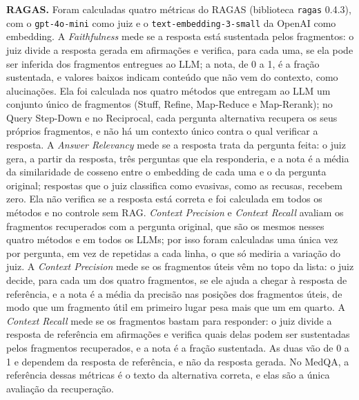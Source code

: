 \textbf{RAGAS.} Foram calculadas quatro métricas do RAGAS \cite{es2024ragas} (biblioteca \texttt{ragas} 0.4.3), com o \texttt{gpt-4o-mini} como juiz e o \texttt{text-embedding-3-small} da OpenAI como embedding. A \emph{Faithfulness} mede se a resposta está sustentada pelos fragmentos: o juiz divide a resposta gerada em afirmações e verifica, para cada uma, se ela pode ser inferida dos fragmentos entregues ao LLM; a nota, de 0 a 1, é a fração sustentada, e valores baixos indicam conteúdo que não vem do contexto, como alucinações. Ela foi calculada nos quatro métodos que entregam ao LLM um conjunto único de fragmentos (Stuff, Refine, Map-Reduce e Map-Rerank); no Query Step-Down e no Reciprocal, cada pergunta alternativa recupera os seus próprios fragmentos, e não há um contexto único contra o qual verificar a resposta. A \emph{Answer Relevancy} mede se a resposta trata da pergunta feita: o juiz gera, a partir da resposta, três perguntas que ela responderia, e a nota é a média da similaridade de cosseno entre o embedding de cada uma e o da pergunta original; respostas que o juiz classifica como evasivas, como as recusas, recebem zero. Ela não verifica se a resposta está correta e foi calculada em todos os métodos e no controle sem RAG. \emph{Context Precision} e \emph{Context Recall} avaliam os fragmentos recuperados com a pergunta original, que são os mesmos nesses quatro métodos e em todos os LLMs; por isso foram calculadas uma única vez por pergunta, em vez de repetidas a cada linha, o que só mediria a variação do juiz. A \emph{Context Precision} mede se os fragmentos úteis vêm no topo da lista: o juiz decide, para cada um dos quatro fragmentos, se ele ajuda a chegar à resposta de referência, e a nota é a média da precisão nas posições dos fragmentos úteis, de modo que um fragmento útil em primeiro lugar pesa mais que um em quarto. A \emph{Context Recall} mede se os fragmentos bastam para responder: o juiz divide a resposta de referência em afirmações e verifica quais delas podem ser sustentadas pelos fragmentos recuperados, e a nota é a fração sustentada. As duas vão de 0 a 1 e dependem da resposta de referência, e não da resposta gerada. No MedQA, a referência dessas métricas é o texto da alternativa correta, e elas são a única avaliação da recuperação.

